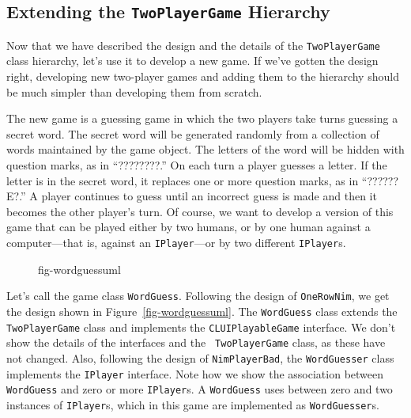 \subsection{Extending the {\tt TwoPlayerGame} Hierarchy}

Now that we have described the design and the details of the
{\tt TwoPlayerGame} class hierarchy, let's use it to develop
a new game. If we've gotten the design right, developing
new two-player games and adding them to the hierarchy should 
be much simpler than developing them from scratch. 

The new game is a guessing game in which the two players take turns
guessing a secret word.  The secret word will be generated randomly
from a collection of words maintained by the game object. The letters
of the word will be hidden with question marks, as in ``????????.''
On each turn a player guesses a letter. If the letter is in the secret
word, it replaces one or more question marks, as in ``??????E?.''  A
player continues to guess until an incorrect guess is made and then it
becomes the other player's turn.  Of course, we want to develop a
version of this game that can be played either by two humans, or by
one human against a computer---that is, against an {\tt IPlayer}---or
by two different {\tt IPlayer}s.

\begin{figure}[h]
 {fig-wordguessuml}

\end{figure}

Let's call the game class {\tt WordGuess}. Following the design of
{\tt OneRowNim}, we get the design shown in 
Figure~\ref{fig-wordguessuml}.  The {\tt WordGuess} class extends the
{\tt TwoPlayerGame} class and implements the {\tt CLUIPlayableGame}
interface. We don't show the details of the interfaces and the {\tt
TwoPlayerGame} class, as these have not changed.  Also, following the
design of {\tt NimPlayerBad}, the {\tt WordGuesser} class implements
the {\tt IPlayer} interface.  Note how we show the association between
{\tt WordGuess} and zero or more {\tt IPlayer}s.  A {\tt WordGuess}
uses between zero and two instances of {\tt IPlayer}s, which in
this game are implemented as {\tt WordGuesser}s.

